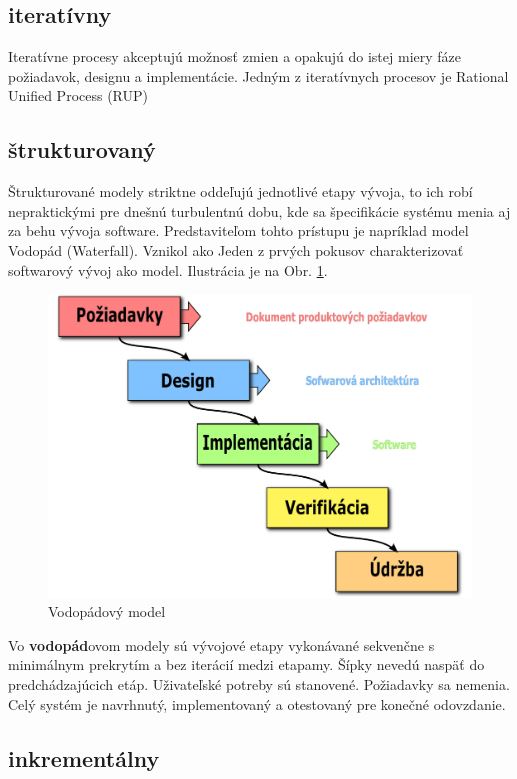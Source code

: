 \subsection{iteratívny}
Iteratívne procesy akceptujú možnosť zmien a opakujú do istej miery fáze požiadavok, designu a implementácie. Jedným z iteratívnych procesov je Rational Unified Process (RUP)
\subsection{štrukturovaný}
Štrukturované modely striktne oddeľujú jednotlivé etapy vývoja, to ich robí nepraktickými pre dnešnú turbulentnú dobu, kde sa špecifikácie systému menia aj za behu vývoja software. Predstaviteľom tohto prístupu je napríklad model Vodopád (Waterfall). Vznikol ako Jeden z prvých pokusov charakterizovať softwarový vývoj ako model. Ilustrácia je na Obr. \ref{fig:waterfall_model}.

\begin{figure}[H]
	\label{fig:waterfall_model}
	\centering
	\includegraphics[scale=0.5]{obrazky-figures/TR-waterfall-model}
	\caption{Vodopádový model}
\end{figure}

Vo \textbf{vodopád}ovom modely sú vývojové etapy vykonávané sekvenčne s minimálnym prekrytím a bez iterácií medzi etapamy. Šípky nevedú naspäť do predchádzajúcich etáp. Uživateľské potreby sú stanovené. Požiadavky sa nemenia. Celý systém je navrhnutý, implementovaný a otestovaný pre konečné odovzdanie.


\subsection{inkrementálny}

